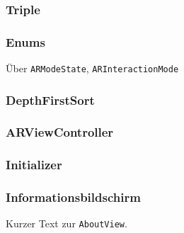 \subsubsection{Triple}

\subsubsection{Enums} \label{subsub:umsetzung-enums}

Über \texttt{ARModeState}, \texttt{ARInteractionMode}

\subsubsection{DepthFirstSort}

\subsubsection{ARViewController}

\subsubsection{Initializer}

\subsubsection{Informationsbildschirm}

Kurzer Text zur \texttt{AboutView}.
